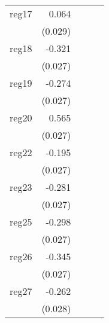 {\begin{longtable}{l*{4}{D{.}{.}{-1}}}
\addlinespace
reg17       &       0.064\sym{*}  &                     &                     &                     \\
            &     (0.029)         &                     &                     &                     \\
\addlinespace
reg18       &      -0.321\sym{***}&                     &                     &                     \\
            &     (0.027)         &                     &                     &                     \\
\addlinespace
reg19       &      -0.274\sym{***}&                     &                     &                     \\
            &     (0.027)         &                     &                     &                     \\
\addlinespace
reg20       &       0.565\sym{***}&                     &                     &                     \\
            &     (0.027)         &                     &                     &                     \\
\addlinespace
reg22       &      -0.195\sym{***}&                     &                     &                     \\
            &     (0.027)         &                     &                     &                     \\
\addlinespace
reg23       &      -0.281\sym{***}&                     &                     &                     \\
            &     (0.027)         &                     &                     &                     \\
\addlinespace
reg25       &      -0.298\sym{***}&                     &                     &                     \\
            &     (0.027)         &                     &                     &                     \\
\addlinespace
reg26       &      -0.345\sym{***}&                     &                     &                     \\
            &     (0.027)         &                     &                     &                     \\
\addlinespace
reg27       &      -0.262\sym{***}&                     &                     &                     \\
            &     (0.028)         &                     &                     &                     \\

\end{longtable}}
